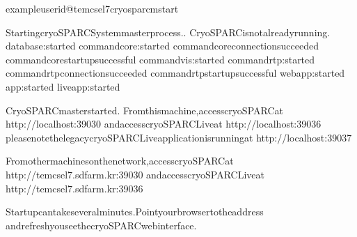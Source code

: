 \documentclass[a4paper,11pt,english]{sphinxmanual}
\begin{document}
\begin{sphinxVerbatim}[commandchars=\\\{\}]
exampleuserid@tem\PYGZhy{}cs\PYGZhy{}el7\PYGZdl{}\PYGZgt{}cryosparcmstart

StartingcryoSPARCSystemmasterprocess..
CryoSPARCisnotalreadyrunning.
database:started
command\PYGZus{}core:started
command\PYGZus{}coreconnectionsucceeded
command\PYGZus{}corestartupsuccessful
command\PYGZus{}vis:started
command\PYGZus{}rtp:started
command\PYGZus{}rtpconnectionsucceeded
command\PYGZus{}rtpstartupsuccessful
webapp:started
app:started
liveapp:started
\PYGZhy{}\PYGZhy{}\PYGZhy{}\PYGZhy{}\PYGZhy{}\PYGZhy{}\PYGZhy{}\PYGZhy{}\PYGZhy{}\PYGZhy{}\PYGZhy{}\PYGZhy{}\PYGZhy{}\PYGZhy{}\PYGZhy{}\PYGZhy{}\PYGZhy{}\PYGZhy{}\PYGZhy{}\PYGZhy{}\PYGZhy{}\PYGZhy{}\PYGZhy{}\PYGZhy{}\PYGZhy{}\PYGZhy{}\PYGZhy{}\PYGZhy{}\PYGZhy{}\PYGZhy{}\PYGZhy{}\PYGZhy{}\PYGZhy{}\PYGZhy{}\PYGZhy{}\PYGZhy{}\PYGZhy{}\PYGZhy{}\PYGZhy{}\PYGZhy{}\PYGZhy{}\PYGZhy{}\PYGZhy{}\PYGZhy{}\PYGZhy{}\PYGZhy{}\PYGZhy{}\PYGZhy{}\PYGZhy{}\PYGZhy{}\PYGZhy{}\PYGZhy{}\PYGZhy{}

CryoSPARCmasterstarted.
Fromthismachine,accesscryoSPARCat
http://localhost:39030
andaccesscryoSPARCLiveat
http://localhost:39036
pleasenotethelegacycryoSPARCLiveapplicationisrunningat
http://localhost:39037

Fromothermachinesonthenetwork,accesscryoSPARCat
http://tem\PYGZhy{}cs\PYGZhy{}el7.sdfarm.kr:39030
andaccesscryoSPARCLiveat
http://tem\PYGZhy{}cs\PYGZhy{}el7.sdfarm.kr:39036


Startupcantakeseveralminutes.Pointyourbrowsertotheaddress
andrefreshyouseethecryoSPARCwebinterface.
\end{sphinxVerbatim}
\end{document}

